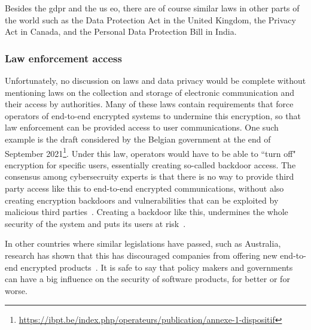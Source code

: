 Besides the \gls{gdpr} and the \gls{us} \gls{eo}, there are of course similar laws in other parts of the world such as the Data Protection Act in the United Kingdom, the Privacy Act in Canada, and the Personal Data Protection Bill in India.

\subsubsection{Law enforcement access}
Unfortunately, no discussion on laws and data privacy would be complete without mentioning laws on the collection and storage of electronic communication and their access by authorities.
Many of these laws contain requirements that force operators of end-to-end encrypted systems to undermine this encryption, so that law enforcement can be provided access to user communications.
One such example is the draft considered by the Belgian government at the end of September 2021\footnote{\url{https://ibpt.be/index.php/operateurs/publication/annexe-1-dispositif}}.
Under this law, operators would have to be able to ``turn off" encryption for specific users, essentially creating so-called backdoor access.
The consensus among cybersecruity experts is that there is no way to provide third party access like this to end-to-end encrypted communications, without also creating encryption backdoors and vulnerabilities that can be exploited by malicious third parties~\cite{bliss1996effective}.
Creating a backdoor like this, undermines the whole security of the system and puts its users at risk~\cite{encryptionmyths}.

In other countries where similar legislations have passed, such as Australia, research has shown that this has discouraged companies from offering new end-to-end encrypted products~\cite{barker2021economic}.
It is safe to say that policy makers and governments can have a big influence on the security of software products, for better or for worse.